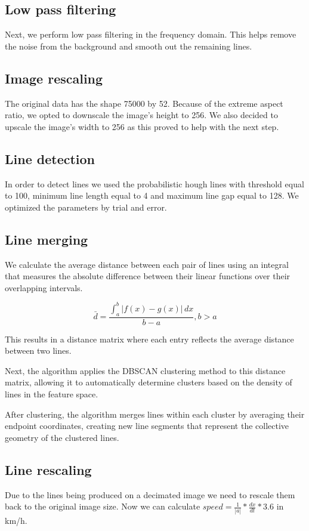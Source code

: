 \documentclass{article}
\begin{document}
\subsection{Low pass filtering}
Next, we perform low pass filtering in the frequency domain. This helps remove the noise from the background and smooth out the remaining lines.

\subsection{Image rescaling}
The original data has the shape 75000 by 52. Because of the extreme aspect ratio, we opted to downscale the image's height to 256. We also decided to upscale the image's width to 256 as this proved to help with the next step.

\subsection{Line detection}
In order to detect lines we used the probabilistic hough lines with threshold equal to 100, minimum line length equal to 4 and maximum line gap equal to 128. We optimized the parameters by trial and error.

\subsection{Line merging}
We calculate the average distance between each pair of lines using an integral that measures the absolute difference between their linear functions over their overlapping intervals.

\[
\bar{d} = \frac{\int_{a}^{b} |f(x) - g(x)| \,dx}{b - a}, b > a
\]

\noindent This results in a distance matrix where each entry reflects the average distance between two lines.

Next, the algorithm applies the DBSCAN clustering method to this distance matrix, allowing it to automatically determine clusters based on the density of lines in the feature space.

After clustering, the algorithm merges lines within each cluster by averaging their endpoint coordinates, creating new line segments that represent the collective geometry of the clustered lines.

\subsection{Line rescaling}
Due to the lines being produced on a decimated image we need to rescale them back to the original image size. Now we can calculate $speed = \frac{1}{|a|}*\frac{dx}{dt}*3.6$ in km/h.
\end{document}
